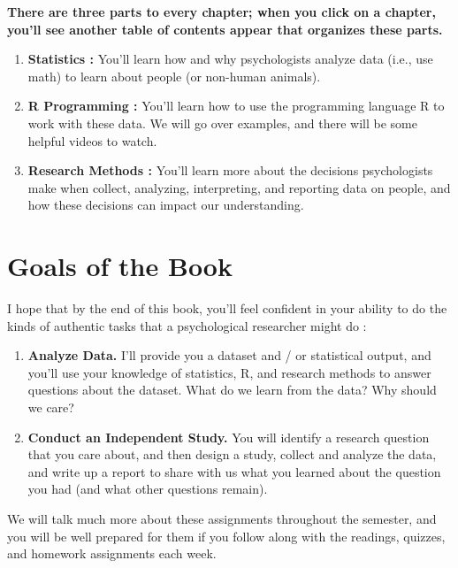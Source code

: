\documentclass[
  letterpaper,
  DIV=11,
  numbers=noendperiod,
  oneside]{scrreprt}
\providecommand{\tightlist}{%
  \setlength{\itemsep}{0pt}\setlength{\parskip}{0pt}}\usepackage{longtable,booktabs,array}
\begin{document}
\textbf{There are three parts to every chapter; when you click on a
chapter, you'll see another table of contents appear that organizes
these parts.}

\begin{enumerate}
\def\labelenumi{\arabic{enumi}.}
\tightlist
\item
  \textbf{Statistics :} You'll learn how and why psychologists analyze
  data (i.e., use math) to learn about people (or non-human animals).
\item
  \textbf{R Programming :} You'll learn how to use the programming
  language R to work with these data. We will go over examples, and
  there will be some helpful videos to watch.
\item
  \textbf{Research Methods :} You'll learn more about the decisions
  psychologists make when collect, analyzing, interpreting, and
  reporting data on people, and how these decisions can impact our
  understanding.
\end{enumerate}

\section*{Goals of the Book}\label{goals-of-the-book}


I hope that by the end of this book, you'll feel confident in your
ability to do the kinds of authentic tasks that a psychological
researcher might do :

\begin{enumerate}
\def\labelenumi{\arabic{enumi}.}
\item
  \textbf{Analyze Data.} I'll provide you a dataset and / or statistical
  output, and you'll use your knowledge of statistics, R, and research
  methods to answer questions about the dataset. What do we learn from
  the data? Why should we care?
\item
  \textbf{Conduct an Independent Study.} You will identify a research
  question that you care about, and then design a study, collect and
  analyze the data, and write up a report to share with us what you
  learned about the question you had (and what other questions remain).
\end{enumerate}

We will talk much more about these assignments throughout the semester,
and you will be well prepared for them if you follow along with the
readings, quizzes, and homework assignments each week.
\end{document}

